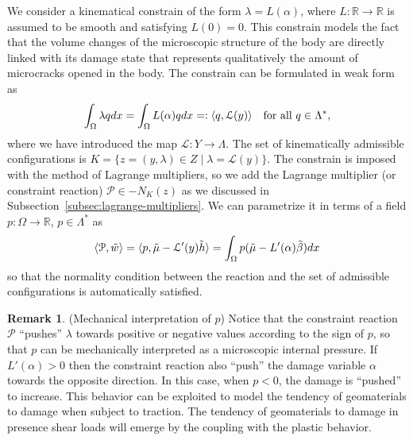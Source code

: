 \documentclass[a4paper,10pt,oneside]{amsbook}
\numberwithin{section}{chapter}
\numberwithin{equation}{chapter}
\theoremstyle{definition}
\newtheorem{rmk}[prop]{Remark}
\DeclarePairedDelimiter{\dual}{\langle}{\rangle}
\begin{document}
 We consider a kinematical constrain of the form $\lambda=L(\alpha)$, where $L\colon\mathbb{R}\to\mathbb{R}$ is assumed to be smooth and satisfying $L(0)=0$. This constrain models the fact that the volume changes of the microscopic structure of the body are directly linked with its damage state that represents qualitatively the amount of microcracks opened in the body. The constrain can be formulated in weak form as
\[
\int_\Omega\lambda qdx=\int_\Omega L(\alpha)qdx=:\dual{q,\mathcal{L}(y)}\quad\text{for all $q\in\Lambda^*$},
\]
where we have introduced the map $\mathcal{L}\colon Y\to\Lambda$. The set of kinematically admissible configurations is $K=\{z=(y,\lambda)\in Z\;|\;\lambda=\mathcal{L}(y)\}$. The constrain is imposed with the method of Lagrange multipliers, so we add the Lagrange multiplier (or constraint reaction) $\mathcal{P}\in-N_K(z)$ as we discussed in Subsection~\ref{subsec:lagrange-multipliers}. We can parametrize it in terms of a field $p\colon\Omega\to\mathbb{R}$, $p\in\Lambda^*$ as
\[
\dual{\mathcal{P},\tilde w}=\dual{p,\tilde\mu-\mathcal{L}'(y)\tilde h}=\int_\Omega p(\tilde\mu-L'(\alpha)\tilde\beta)dx
\]
so that the normality condition between the reaction and the set of admissible configurations is automatically satisfied.
\begin{rmk}(Mechanical interpretation of $p$)
\label{rmk:interpretation-of-p}
Notice that the constraint reaction $\mathcal{P}$ ``pushes'' $\lambda$ towards positive or negative values according to the sign of $p$, so that $p$ can be mechanically interpreted as a microscopic internal pressure. If $L'(\alpha)>0$ then the constraint reaction also ``push'' the damage variable $\alpha$ towards the opposite direction. In this case, when $p<0$, the damage is ``pushed'' to increase. This behavior can be exploited to model the tendency of geomaterials to damage when subject to traction. The tendency of geomaterials to damage in presence shear loads will emerge by the coupling with the plastic behavior.
\end{rmk}
\end{document}
